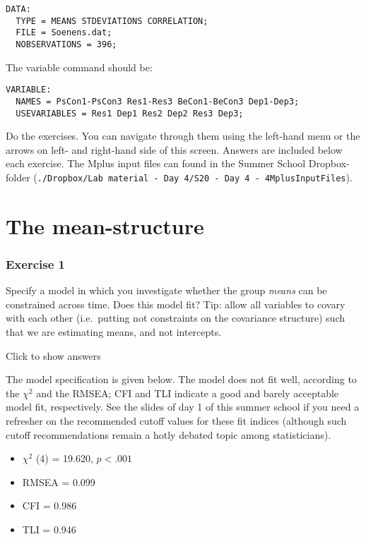 \documentclass[
]{book}
\providecommand{\tightlist}{%
  \setlength{\itemsep}{0pt}\setlength{\parskip}{0pt}}
\begin{document}
\begin{verbatim}
DATA:       
  TYPE = MEANS STDEVIATIONS CORRELATION;   
  FILE = Soenens.dat;
  NOBSERVATIONS = 396;
\end{verbatim}

The variable command should be:

\begin{verbatim}
VARIABLE:   
  NAMES = PsCon1-PsCon3 Res1-Res3 BeCon1-BeCon3 Dep1-Dep3;
  USEVARIABLES = Res1 Dep1 Res2 Dep2 Res3 Dep3;
\end{verbatim}

Do the exercises. You can navigate through them using the left-hand menu or the arrows on left- and right-hand side of this screen. Answers are included below each exercise. The Mplus input files can found in the Summer School Dropbox-folder (\texttt{./Dropbox/Lab\ material\ -\ Day\ 4/S20\ -\ Day\ 4\ -\ 4MplusInputFiles}).

\hypertarget{the-mean-structure}{%
\section*{The mean-structure}\label{the-mean-structure}}

\hypertarget{exercise-1}{%
\subsubsection*{Exercise 1}\label{exercise-1}}

Specify a model in which you investigate whether the group \emph{means} can be constrained across time. Does this model fit? Tip: allow all variables to covary with each other (i.e.~putting not constraints on the covariance structure) such that we are estimating means, and not intercepts.

Click to show answers

The model specification is given below. The model does not fit well, according to the \(\chi^{2}\) and the RMSEA; CFI and TLI indicate a good and barely acceptable model fit, respectively. See the slides of day 1 of this summer school if you need a refresher on the recommended cutoff values for these fit indices (although such cutoff recommendations remain a hotly debated topic among statisticians).

\begin{itemize}
\tightlist
\item
  \(\chi^{2}\) (4) = 19.620, \(p < .001\)
\item
  RMSEA = 0.099
\item
  CFI = 0.986
\item
  TLI = 0.946
\end{itemize}
\end{document}
